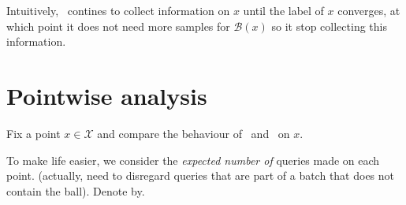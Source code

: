 \documentclass{article}
\def\X{{\mathcal X}}
\def\B{{\mathcal B}}
\begin{document}
  Intuitively, \ONNB\ contines to collect information on $x$ until the
  label of $x$ converges, at which point it does not need more
  samples for $\B(x)$ so it stop collecting this information.

  \section{Pointwise analysis}

  Fix a point $x \in \X$ and compare the behaviour of \NNB\ and \ONNB\
  on $x$.

  To make life easier, we consider the {\em expected number of}
  queries made on each point. (actually, need to disregard queries
  that are part of a batch that does not contain the ball). Denote by.
    
  
\end{document}
